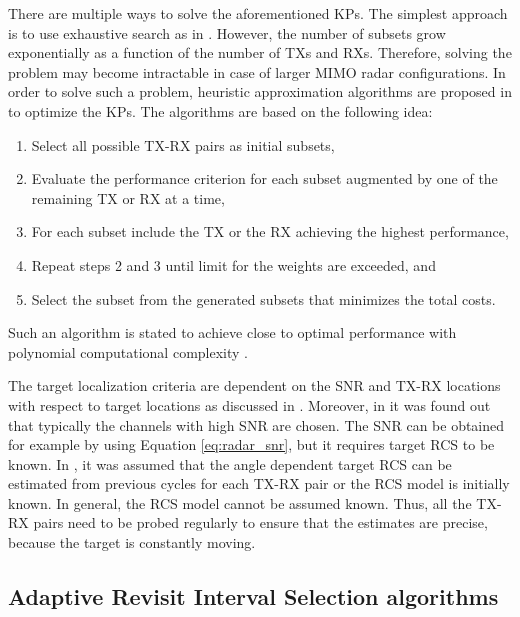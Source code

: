 \documentclass[english, 12pt, a4paper, elec, utf8, a-1b, online]{aaltothesis}
\begin{document}
There are multiple ways to solve the aforementioned KPs.
The simplest approach is to use exhaustive search as in \cite{Sun2014}.
However, the number of subsets grow exponentially as a function of the number of TXs and RXs.
Therefore, solving the problem may become intractable in case of larger MIMO radar configurations.
In order to solve such a problem, heuristic approximation algorithms are proposed in \cite{Godrich2011a, Godrich2011} to optimize the KPs.
The algorithms are based on the following idea:
\begin{enumerate}
    \item Select all possible TX-RX pairs as initial subsets,
    \item Evaluate the performance criterion for each subset augmented by one of the remaining TX or RX at a time, 
    \item For each subset include the TX or the RX achieving the highest performance,
    \item Repeat steps 2 and 3 until limit for the weights are exceeded, and
    \item Select the subset from the generated subsets that minimizes the total costs. 
\end{enumerate}
Such an algorithm is stated to achieve close to optimal performance with polynomial computational complexity \cite{Godrich2011a, Godrich2011}.

The target localization criteria are dependent on the SNR and TX-RX locations with respect to target locations as discussed in \cite{Sun2014}.
Moreover, in \cite{Sun2014} it was found out that typically the channels with high SNR are chosen.
The SNR can be obtained for example by using Equation \eqref{eq:radar_snr}, but it requires target RCS to be known.
In \cite{Godrich2011a, Godrich2011, Sun2014}, it was assumed that the angle dependent target RCS can be estimated from previous cycles for each TX-RX pair or the RCS model is initially known.
In general, the RCS model cannot be assumed known. 
Thus, all the TX-RX pairs need to be probed regularly to ensure that the estimates are precise, because the target is constantly moving.




\subsection{Adaptive Revisit Interval Selection algorithms} \label{sec:tbm_ri}
\end{document}
